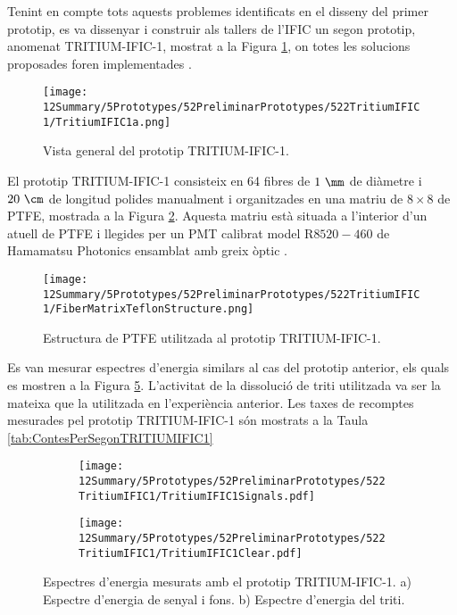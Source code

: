 Tenint en compte tots aquests problemes identificats en el disseny del primer prototip, es va dissenyar i construir als tallers de l'IFIC un segon prototip, anomenat TRITIUM-IFIC-1, mostrat a la Figura \ref{fig:TritumIFIC1s}, on totes les solucions proposades foren implementades .
\begin{figure}[h]
\centering
\texttt{[image: 12Summary/5Prototypes/52PreliminarPrototypes/522TritiumIFIC1/TritiumIFIC1a.png]}
\caption{Vista general del prototip TRITIUM-IFIC-1.\label{fig:TritumIFIC1s}}
\end{figure}
El prototip TRITIUM-IFIC-1 consisteix en 64 fibres de $1~\mm$ de diàmetre i $20~\cm$ de longitud polides manualment i organitzades en una matriu de $8\times 8$ de PTFE, mostrada a la Figura \ref{fig:EstructuraPTFEFibresTritiumIFIC1}. Aquesta matriu està situada a l'interior d'un atuell de PTFE i llegides per un PMT calibrat model R$8520-460$ de Hamamatsu Photonics \cite{DataSheetPMTs} ensamblat amb greix òptic \cite{OpticalGrease}.
\begin{figure}[h]
\centering
\texttt{[image: 12Summary/5Prototypes/52PreliminarPrototypes/522TritiumIFIC1/FiberMatrixTeflonStructure.png]}
\caption{Estructura de PTFE utilitzada al prototip TRITIUM-IFIC-1.\label{fig:EstructuraPTFEFibresTritiumIFIC1}}
\end{figure}
Es van mesurar espectres d'energia similars al cas del prototip anterior, els quals es mostren a la Figura \ref{fig:EspectresEnergeticsTRITIUMIFIC1}. L'activitat de la dissolució de triti utilitzada va ser la mateixa que la utilitzada en l'experiència anterior. Les taxes de recomptes mesurades pel prototip TRITIUM-IFIC-1 són mostrats a la Taula \ref{tab:ContesPerSegonTRITIUMIFIC1}

\begin{figure}
\centering
    \begin{subfigure}[b]{1\textwidth}
    \centering
    \texttt{[image: 12Summary/5Prototypes/52PreliminarPrototypes/522TritiumIFIC1/TritiumIFIC1Signals.pdf]}  
    \caption{\label{subfig:EspectreEnergeticSenyalFonsTritiumIFIC1}}
    \end{subfigure}
    \hfill
    \begin{subfigure}[b]{1\textwidth}
    \centering
    \texttt{[image: 12Summary/5Prototypes/52PreliminarPrototypes/522TritiumIFIC1/TritiumIFIC1Clear.pdf]}  
    \caption{\label{subfig:EspectreEnergeticTritiTritiumIFIC1}}
    \end{subfigure}
 \caption{Espectres d'energia mesurats amb el prototip TRITIUM-IFIC-1. a) Espectre d'energia de senyal i fons. b) Espectre d'energia del triti.}
 \label{fig:EspectresEnergeticsTRITIUMIFIC1}
\end{figure}

